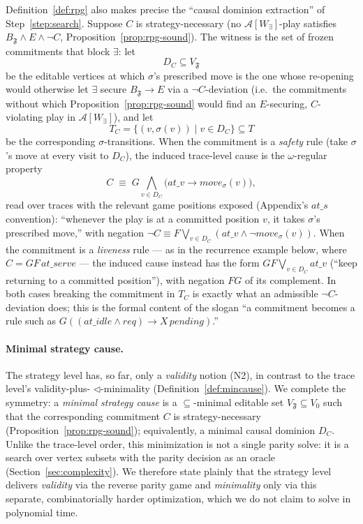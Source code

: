 \documentclass[11pt]{article}
\theoremstyle{remark}
\newcommand{\Frame}{\mathfrak{F}}
\begin{document}
Definition~\ref{def:rpg} also makes precise the ``causal dominion extraction'' of
Step~\ref{step:search}. Suppose \(C\) is strategy-necessary (no
\(\mathcal{A}[W_\exists]\)-play satisfies \(B_{\Frame}\wedge E\wedge\neg C\),
Proposition~\ref{prop:rpg-sound}). The witness is the set of frozen commitments
that block \(\exists\): let
\[
  D_C\subseteq V_{\Frame}
\]
be the editable vertices at which \(\sigma\)'s prescribed move is the one whose
re-opening would otherwise let \(\exists\) secure \(B_{\Frame}\rightarrow E\) via a
\(\neg C\)-deviation (i.e.\ the commitments without which
Proposition~\ref{prop:rpg-sound} would find an \(E\)-securing, \(C\)-violating
play in \(\mathcal{A}[W_\exists]\)), and let
\[
  T_C=\{(v,\sigma(v))\mid v\in D_C\}\subseteq T
\]
be the corresponding \(\sigma\)-transitions. When the commitment is a
\emph{safety} rule (take \(\sigma\)'s move at every visit to \(D_C\)), the induced
trace-level cause is the \(\omega\)-regular property
\[
  C
  \;\equiv\;
  G\!\!\bigwedge_{v\in D_C}\!\!
  \bigl(\mathit{at\_}v \rightarrow \mathit{move}_{\sigma}(v)\bigr),
\]
read over traces with the relevant game positions exposed (Appendix's
\(\mathit{at\_s}\) convention): ``whenever the play is at a committed position
\(v\), it takes \(\sigma\)'s prescribed move,'' with negation
\(\neg C\equiv F\bigvee_{v\in D_C}(\mathit{at\_}v\wedge\neg\mathit{move}_\sigma(v))\).
When the commitment is a \emph{liveness} rule --- as in the recurrence example
below, where \(C=GF\,\mathit{at\_serve}\) --- the induced cause instead has the
form \(GF\bigvee_{v\in D_C}\mathit{at\_}v\) (``keep returning to a committed
position''), with negation \(FG\) of its complement. In both cases breaking the
commitment in \(T_C\) is exactly what an admissible \(\neg C\)-deviation does;
this is the formal content of the slogan ``a commitment becomes a rule such as
\(G((\mathit{at\_idle}\wedge req)\rightarrow X\,pending)\).''

\paragraph{Minimal strategy cause.} The strategy level has, so far, only a
\emph{validity} notion (N2), in contrast to the trace level's validity-plus-%
\(\triangleleft\)-minimality (Definition~\ref{def:mincause}). We complete the
symmetry: a \emph{minimal strategy cause} is a \(\subseteq\)-minimal editable set
\(V_{\Frame}\subseteq V_0\) such that the corresponding commitment \(C\) is
strategy-necessary (Proposition~\ref{prop:rpg-sound}); equivalently, a minimal
causal dominion \(D_C\). Unlike the trace-level order, this minimization is not a
single parity solve: it is a search over vertex subsets with the parity decision
as an oracle (Section~\ref{sec:complexity}). We therefore state plainly that the
strategy level delivers \emph{validity} via the reverse parity game and
\emph{minimality} only via this separate, combinatorially harder optimization,
which we do not claim to solve in polynomial time.
\end{document}
